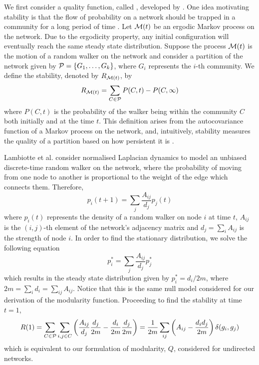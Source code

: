 We first consider a quality function, called , developed by \cite{LDB08}.
One idea motivating stability is that the flow of probability on a network should be trapped in a community for a long period of time \cite{Lam10}.
Let $\mathcal M(t)$ be an ergodic Markov process on the network.
Due to the ergodicity property, any initial configuration will eventually reach the same steady state distribution.
Suppose the process $\mathcal M(t)$ is the motion of a random walker on the network and consider a partition of the network given by $\mathcal P = \{ G_{1},\dots,G_{k} \}$, where $G_{i}$ represents the $i$-th community.
We define the stability, denoted by $R_{\mathcal M(t)}$, by
\begin{equation}
	\label{eq:stability}
	R_{\mathcal M(t)} = \sum_{C \in \mathcal P} P(C,t) - P(C,\infty)
\end{equation}
where $P(C,t)$ is the probability of the walker being within the community $C$ both initially and at the time $t$.
This definition arises from the autocovariance function of a Markov process on the network, and, intuitively, stability measures the quality of a partition based on how persistent it is \cite{DYB08}.

Lambiotte et al. \cite{LDB08} consider normalised Laplacian dynamics to model an unbiased discrete-time random walker on the network, where the probability of moving from one node to another is proportional to the weight of the edge which connects them.
Therefore,
\begin{equation}
	\label{eq:densityRandomWalker}
	p_{i}(t+1) = \sum_{j} \frac{A_{ij}}{d_{j}} p_{j}(t)
\end{equation}
where $p_{i}(t)$ represents the density of a random walker on node $i$ at time $t$, $A_{ij}$ is the $(i,j)$-th element of the network's adjacency matrix and $d_{j} = \sum_{i} A_{ij}$ is the strength of node $i$.
In order to find the stationary distribution, we solve the following equation
\begin{equation}
	\label{eq:solveDensityRandomWalkerStationaryDistribution}
	p_{i}^{*} = \sum_{j} \frac{A_{ij}}{d_{j}} p_{j}^{*}
\end{equation}
which results in the steady state distribution given by $p_{i}^{*} = d_{i}/2m$, where $2m = \sum_{i} d_{i} = \sum_{ij} A_{ij}$.
Notice that this is the same null model considered for our derivation of the modularity function.
Proceeding to find the stability at time $t=1$,
\begin{equation}
	\label{eq:stabilityAtTime1}
	R(1) = \sum_{C \in \mathcal P} \sum_{i,j \in C} \left( \frac{A_{ij}}{d_{j}} \frac{d_{j}}{2m} - \frac{d_{i}}{2m} \frac{d_{j}}{2m} \right) = \frac{1}{2m} \sum_{ij} \left( A_{ij} - \frac{d_{i}d_{j}}{2m} \right) \delta(g_{i},g_{j})
\end{equation}
which is equivalent to our formulation of modularity, $Q$, considered for undirected networks.

